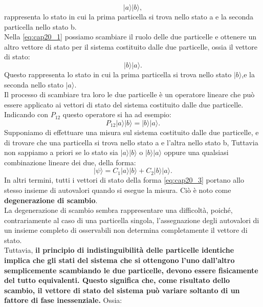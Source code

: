 \documentclass[a4paper,12pt,oneside]{book}
\begin{document}
\begin{equation}
|a\rangle|b\rangle,
\label{eq:cap20_1}
\end{equation}
rappresenta lo stato in cui la prima particella si trova nello stato a e la seconda particella nello stato b.\\
Nella \ref{eq:cap20_1} possiamo scambiare il ruolo delle due particelle e ottenere un altro vettore di stato per il sistema costituito dalle due particelle, ossia il vettore di stato:\\
\begin{equation}
|b\rangle|a\rangle.
\label{eq:cap20_2}
\end{equation}
Questo rappresenta lo stato in cui la prima particella si trova nello stato $|b\rangle$,e la seconda nello stato $|a\rangle$.\\
Il processo di scambiare tra loro le due particelle è un operatore lineare che può essere applicato ai vettori di stato del sistema costituito dalle due particelle. Indicando con $P_{12}$ questo operatore si ha ad esempio:
\begin{equation}
P_{12}|a\rangle|b\rangle = |b\rangle|a\rangle.
\end{equation}
Supponiamo di effettuare una misura sul sistema costituito dalle due particelle, e di trovare che una particella si trova nello stato a e l'altra nello stato b, Tuttavia non sappiamo a priori se lo stato sia $|a\rangle|b\rangle$ o $|b\rangle|a\rangle$ oppure una qualsiasi combinazione lineare dei due, della forma:
\begin{equation}
|\psi\rangle = C_1|a\rangle|b\rangle + C_2 |b\rangle|a\rangle.
\label{eq:cap20_3}
\end{equation}
In altri termini, tutti i vettori di stato della forma \ref{eq:cap20_3} portano allo stesso insieme di autovalori quando si esegue la misura. Ciò è noto come \textbf{degenerazione di scambio}.\\
La degenerazione di scambio sembra rappresentare una difficoltà, poiché, contrariamente al caso di una particella singola, l'assegnazione degli autovalori di un insieme completo di osservabili non determina completamente il vettore di stato.\\
Tuttavia, \textbf{il principio di indistinguibilità delle particelle identiche implica che gli stati del sistema che si ottengono l'uno dall'altro semplicemente scambiando le due particelle, devono essere fisicamente del tutto equivalenti. Questo significa che, come risultato dello scambio, il vettore di stato del sistema può variare soltanto di un fattore di fase inessenziale.} Ossia:
\end{document}
